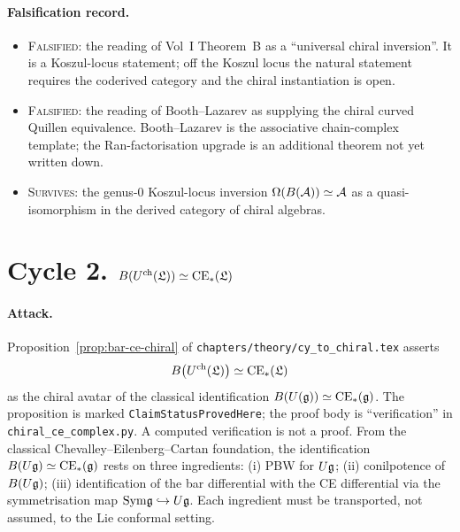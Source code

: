 \paragraph{Falsification record.}
\begin{itemize}
\item
\textsc{Falsified}: the reading of Vol~I Theorem~B as a
``universal chiral inversion''. It is a Koszul-locus statement;
off the Koszul locus the natural statement requires the coderived
category and the chiral instantiation is open.

\item
\textsc{Falsified}: the reading of Booth--Lazarev as supplying the
chiral curved Quillen equivalence. Booth--Lazarev is the
associative chain-complex template; the Ran-factorisation
upgrade is an additional theorem not yet written down.

\item
\textsc{Survives}: the genus-$0$ Koszul-locus inversion
$\Omega(B(\mathcal{A})) \simeq \mathcal{A}$ as a quasi-isomorphism in the
derived category of chiral algebras.
\end{itemize}

\section*{Cycle 2. $B(U^{\mathrm{ch}}(\mathfrak{L})) \simeq \mathrm{CE}_*(\mathfrak{L})$}

\paragraph{Attack.} Proposition~\ref{prop:bar-ce-chiral} of
\texttt{chapters/theory/cy\_to\_chiral.tex} asserts
\[
  B\bigl(U^{\mathrm{ch}}(\mathfrak{L})\bigr) \simeq \mathrm{CE}_*(\mathfrak{L})
\]
as the chiral avatar of the classical identification
$B(U(\mathfrak{g})) \simeq \mathrm{CE}_*(\mathfrak{g})$. The proposition is marked
\texttt{ClaimStatusProvedHere}; the proof body is ``verification''
in \texttt{chiral\_ce\_complex.py}.  A computed verification is
not a proof. From the classical Chevalley--Eilenberg--Cartan
foundation, the identification $B(U\mathfrak{g}) \simeq \mathrm{CE}_*(\mathfrak{g})$ rests
on three ingredients: (i) PBW for $U\mathfrak{g}$; (ii) conilpotence of
$B(U\mathfrak{g})$; (iii) identification of the bar differential with the
CE differential via the symmetrisation map
$\mathrm{Sym}\mathfrak{g} \hookrightarrow U\mathfrak{g}$. Each ingredient must be
transported, not assumed, to the Lie conformal setting.

